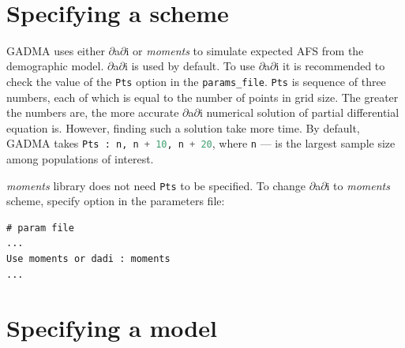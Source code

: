 \documentclass[12pt]{article}
\makeatletter
\newcommand{\dadi}{$\partial$a$\partial$i\xspace}
\newcommand{\moments}{\textit{moments}\xspace}
\newcommand{\py}[1]{\lstinline[language=Python, showstringspaces=False]@#1@}
\makeatother
\begin{document}
~\
\section{Specifying a scheme}

GADMA uses either \dadi or \moments to simulate expected AFS from the demographic model. \dadi is used by default. To use \dadi it is recommended to check the value of the \py{Pts} option in the \py{params_file}. \py{Pts} is sequence of three numbers, each of which is equal to the number of points in grid size. The greater the numbers are, the more accurate \dadi numerical solution of partial differential equation is. However, finding such a solution take more time. By default, GADMA takes \py{Pts : n, n + 10, n + 20}, where \py{n} — is the largest sample size among populations of interest. 

\moments library does not need \py{Pts} to be specified. To change \dadi to \moments scheme, specify option in the parameters file:

\begin{lstlisting}
# param file
...
Use moments or dadi : moments
...
\end{lstlisting}

\section{Specifying a model}
\end{document}

